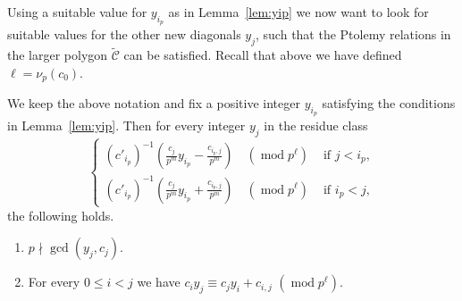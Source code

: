 \documentclass[ALCO,ThmDefs,Unicode,epreuves,published]{cedram}
\numberwithin{equation}{section}
\DeclareMathOperator{\md}{mod}
\begin{document}
Using a suitable value for $y_{i_p}$ as in Lemma~\ref{lem:yip} we now want to
look for suitable values for the other new diagonals $y_j$, such that 
the Ptolemy relations in the larger polygon $\widetilde{\mathcal{C}}$ can 
be satisfied. Recall that above we have defined 
$\ell=\nu_p(c_0)$.


\begin{lemm} \label{lem:yj}
We keep the above notation and fix a positive integer $y_{i_p}$ satisfying the conditions
in Lemma~\ref{lem:yip}. 
Then for every integer $y_j$ in the residue class 
\[
\begin{cases}
(c'_{i_p})^{-1} \left( \frac{c_j}{p^m} y_{i_p} - \frac{c_{i_p,j}}{p^m}\right)\quad
(\md p^{\ell}) & \text{ if } j<i_p ,\\[4pt]
(c'_{i_p})^{-1} \left( \frac{c_j}{p^m} y_{i_p} + \frac{c_{i_p,j}}{p^m}\right) \quad
(\md p^{\ell})
& \text{ if } i_p<j,
\end{cases} 
\]
the following holds.
\begin{enumerate}[label=(\alph*)]
\item\label{lemma4.4_a} %
$p\nmid \gcd(y_j,c_j)$.
\item\label{lemma4.4_b} %
For every $0\le i<j$ we have
$c_i y_j \equiv c_j y_i + c_{i,j}\,\,(\md p^{\ell})$.
\end{enumerate}
\end{lemm}
\end{document}
